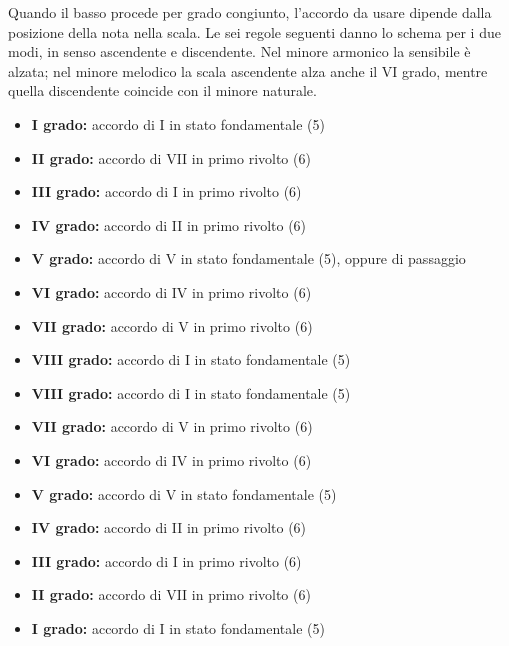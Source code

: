 Quando il basso procede per grado congiunto, l'accordo da usare dipende dalla posizione della nota nella scala. Le sei regole seguenti danno lo schema per i due modi, in senso ascendente e discendente. Nel minore armonico la sensibile è alzata; nel minore melodico la scala ascendente alza anche il VI grado, mentre quella discendente coincide con il minore naturale.

\begin{regola}
	\label{reg:regola_ottava_maggiore_asc}
	\begin{itemize}
		\item \textbf{I grado:} accordo di I in stato fondamentale (5)
		\item \textbf{II grado:} accordo di VII in primo rivolto (6)
		\item \textbf{III grado:} accordo di I in primo rivolto (6)
		\item \textbf{IV grado:} accordo di II in primo rivolto (6)
		\item \textbf{V grado:} accordo di V in stato fondamentale (5), oppure  di passaggio
		\item \textbf{VI grado:} accordo di IV in primo rivolto (6)
		\item \textbf{VII grado:} accordo di V in primo rivolto (6)
		\item \textbf{VIII grado:} accordo di I in stato fondamentale (5)
	\end{itemize}
\end{regola}

\begin{regola}
	\label{reg:regola_ottava_maggiore_disc}
	\begin{itemize}
		\item \textbf{VIII grado:} accordo di I in stato fondamentale (5)
		\item \textbf{VII grado:} accordo di V in primo rivolto (6)
		\item \textbf{VI grado:} accordo di IV in primo rivolto (6)
		\item \textbf{V grado:} accordo di V in stato fondamentale (5)
		\item \textbf{IV grado:} accordo di II in primo rivolto (6)
		\item \textbf{III grado:} accordo di I in primo rivolto (6)
		\item \textbf{II grado:} accordo di VII in primo rivolto (6)
		\item \textbf{I grado:} accordo di I in stato fondamentale (5)
	\end{itemize}
\end{regola}

